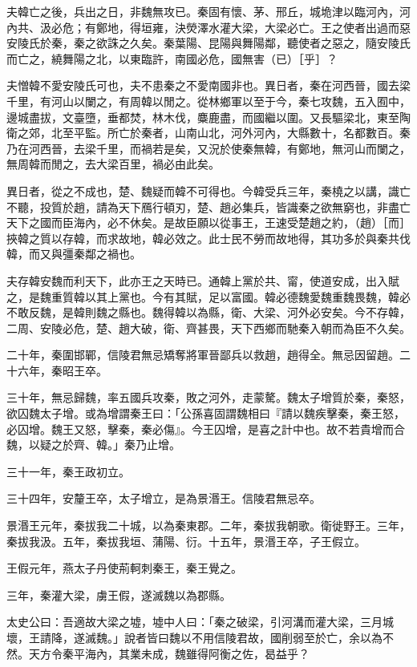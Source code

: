 \begin{pinyinscope}
夫韓亡之後，兵出之日，非魏無攻已。秦固有懷、茅、邢丘，城垝津以臨河內，河內共、汲必危；有鄭地，得垣雍，決熒澤水灌大梁，大梁必亡。王之使者出過而惡安陵氏於秦，秦之欲誅之久矣。秦葉陽、昆陽與舞陽鄰，聽使者之惡之，隨安陵氏而亡之，繞舞陽之北，以東臨許，南國必危，國無害（已）［乎］？

夫憎韓不愛安陵氏可也，夫不患秦之不愛南國非也。異日者，秦在河西晉，國去梁千里，有河山以闌之，有周韓以閒之。從林鄉軍以至于今，秦七攻魏，五入囿中，邊城盡拔，文臺墮，垂都焚，林木伐，麋鹿盡，而國繼以圍。又長驅梁北，東至陶衛之郊，北至平監。所亡於秦者，山南山北，河外河內，大縣數十，名都數百。秦乃在河西晉，去梁千里，而禍若是矣，又況於使秦無韓，有鄭地，無河山而闌之，無周韓而閒之，去大梁百里，禍必由此矣。

異日者，從之不成也，楚、魏疑而韓不可得也。今韓受兵三年，秦橈之以講，識亡不聽，投質於趙，請為天下鴈行頓刃，楚、趙必集兵，皆識秦之欲無窮也，非盡亡天下之國而臣海內，必不休矣。是故臣願以從事王，王速受楚趙之約，（趙）［而］挾韓之質以存韓，而求故地，韓必效之。此士民不勞而故地得，其功多於與秦共伐韓，而又與彊秦鄰之禍也。

夫存韓安魏而利天下，此亦王之天時已。通韓上黨於共、甯，使道安成，出入賦之，是魏重質韓以其上黨也。今有其賦，足以富國。韓必德魏愛魏重魏畏魏，韓必不敢反魏，是韓則魏之縣也。魏得韓以為縣，衛、大梁、河外必安矣。今不存韓，二周、安陵必危，楚、趙大破，衛、齊甚畏，天下西鄉而馳秦入朝而為臣不久矣。

二十年，秦圍邯鄲，信陵君無忌矯奪將軍晉鄙兵以救趙，趙得全。無忌因留趙。二十六年，秦昭王卒。

三十年，無忌歸魏，率五國兵攻秦，敗之河外，走蒙驁。魏太子增質於秦，秦怒，欲囚魏太子增。或為增謂秦王曰：「公孫喜固謂魏相曰『請以魏疾擊秦，秦王怒，必囚增。魏王又怒，擊秦，秦必傷』。今王囚增，是喜之計中也。故不若貴增而合魏，以疑之於齊、韓。」秦乃止增。

三十一年，秦王政初立。

三十四年，安釐王卒，太子增立，是為景湣王。信陵君無忌卒。

景湣王元年，秦拔我二十城，以為秦東郡。二年，秦拔我朝歌。衛徙野王。三年，秦拔我汲。五年，秦拔我垣、蒲陽、衍。十五年，景湣王卒，子王假立。

王假元年，燕太子丹使荊軻刺秦王，秦王覺之。

三年，秦灌大梁，虜王假，遂滅魏以為郡縣。

太史公曰：吾適故大梁之墟，墟中人曰：「秦之破梁，引河溝而灌大梁，三月城壞，王請降，遂滅魏。」說者皆曰魏以不用信陵君故，國削弱至於亡，余以為不然。天方令秦平海內，其業未成，魏雖得阿衡之佐，曷益乎？


\end{pinyinscope}